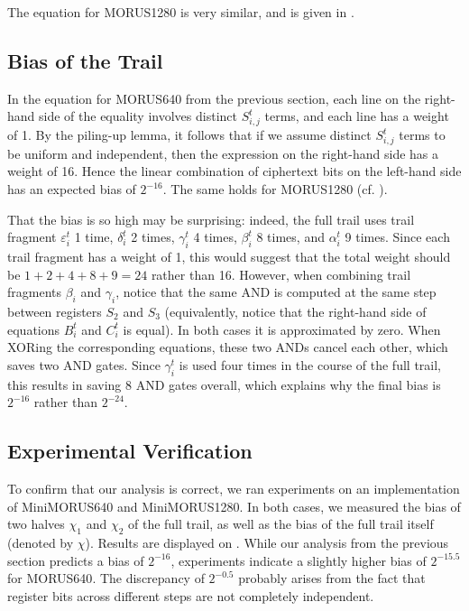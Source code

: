 \documentclass{llncs}
\newcommand{\cipher}[1]{\textsf{#1}}
\begin{document}
The equation for \cipher{MORUS1280} is very similar, and is given in .

\subsection{Bias of the Trail}
\label{sec:minibias}

In the equation for \cipher{MORUS640} from the previous section, each line on the right-hand side of the equality involves distinct $S^t_{i,j}$ terms, and each line has a weight of 1. By the piling-up lemma, it follows that if we assume distinct $S^t_{i,j}$ terms to be uniform and independent, then the expression on the right-hand side has a weight of 16. Hence the linear combination of ciphertext bits on the left-hand side has an expected bias of $2^{-16}$. The same holds for \cipher{MORUS1280} (cf. ).

That the bias is so high may be surprising: indeed, the full trail uses trail fragment $\varepsilon^t_i$ 1 time, $\delta^t_i$ 2 times, $\gamma^t_i$ 4 times, $\beta^t_i$ 8 times, and $\alpha^t_i$ 9 times. Since each trail fragment has a weight of 1, this would suggest that the total weight should be $1+2+4+8+9 = 24$ rather than 16. However, when combining trail fragments $\beta_i$ and $\gamma_i$, notice that the same AND is computed at the same step between registers $S_2$ and $S_3$ (equivalently, notice that the right-hand side of equations $B^t_i$ and $C^t_i$ is equal). In both cases it is approximated by zero. When XORing the corresponding equations, these two ANDs cancel each other, which saves two AND gates. Since $\gamma^t_i$ is used four times in the course of the full trail, this results in saving 8 AND gates overall, which explains why the final bias is $2^{-16}$ rather than $2^{-24}$.

\subsection{Experimental Verification}

To confirm that our analysis is correct, we ran experiments on an implementation of \cipher{MiniMORUS640} and \cipher{MiniMORUS1280}. In both cases, we measured the bias of two halves $\chi_1$ and $\chi_2$ of the full trail, as well as the bias of the full trail itself (denoted by $\chi$). Results are displayed on . 
While our analysis from the previous section predicts a bias of $2^{-16}$, experiments indicate a slightly higher bias of $2^{-15.5}$ for \cipher{MORUS640}. The discrepancy of $2^{-0.5}$ probably arises from the fact that register bits across different steps are not completely independent.
\end{document}
